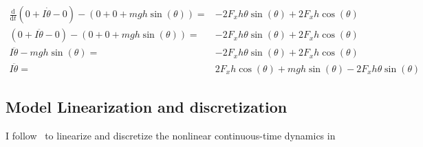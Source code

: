 \documentclass[12pt]{article}
\begin{document}
\begin{align}
\frac{\mathrm{d}}{\mathrm{d}t}
(0+I\dot{\theta}-0)
-(0+0+mgh\sin(\theta))=&-2 F_x h\theta \sin(\theta)
+2F_x h\cos(\theta)\\
(0+I\ddot{\theta}-0)
-(0+0+mgh\sin(\theta))=& -2 F_x h\theta \sin(\theta)
+2F_x h\cos(\theta) \\
I\ddot{\theta}-mgh\sin(\theta)=&-2 F_x h\theta \sin(\theta)
+2F_x h\cos(\theta) \\
I\ddot{\theta}
=& 2 F_x h\cos(\theta)+mgh\sin(\theta)
-2 F_x h\theta \sin(\theta)
\end{align}


\subsection{Model Linearization and discretization}
I follow~\cite{zhakatayev_2017_successive_linearize_MPC}
to linearize and discretize the nonlinear continuous-time dynamics
in~\cite{???}


{}
\end{document}

